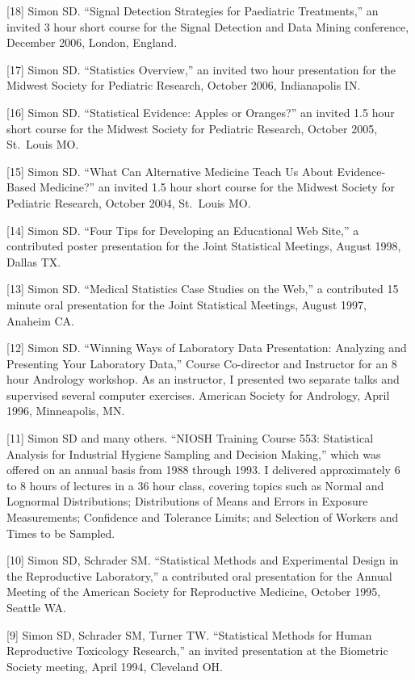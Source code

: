 \documentclass[
  12pt,
]{article}
\begin{document}
{[}18{]} Simon SD. ``Signal Detection Strategies for Paediatric
Treatments,'' an invited 3 hour short course for the Signal Detection
and Data Mining conference, December 2006, London, England.

{[}17{]} Simon SD. ``Statistics Overview,'' an invited two hour
presentation for the Midwest Society for Pediatric Research, October
2006, Indianapolis IN.

{[}16{]} Simon SD. ``Statistical Evidence: Apples or Oranges?'' an
invited 1.5 hour short course for the Midwest Society for Pediatric
Research, October 2005, St.~Louis MO.

{[}15{]} Simon SD. ``What Can Alternative Medicine Teach Us About
Evidence-Based Medicine?'' an invited 1.5 hour short course for the
Midwest Society for Pediatric Research, October 2004, St.~Louis MO.

{[}14{]} Simon SD. ``Four Tips for Developing an Educational Web Site,''
a contributed poster presentation for the Joint Statistical Meetings,
August 1998, Dallas TX.

{[}13{]} Simon SD. ``Medical Statistics Case Studies on the Web,'' a
contributed 15 minute oral presentation for the Joint Statistical
Meetings, August 1997, Anaheim CA.

{[}12{]} Simon SD. ``Winning Ways of Laboratory Data Presentation:
Analyzing and Presenting Your Laboratory Data,'' Course Co-director and
Instructor for an 8 hour Andrology workshop. As an instructor, I
presented two separate talks and supervised several computer exercises.
American Society for Andrology, April 1996, Minneapolis, MN.

{[}11{]} Simon SD and many others. ``NIOSH Training Course 553:
Statistical Analysis for Industrial Hygiene Sampling and Decision
Making,'' which was offered on an annual basis from 1988 through 1993. I
delivered approximately 6 to 8 hours of lectures in a 36 hour class,
covering topics such as Normal and Lognormal Distributions;
Distributions of Means and Errors in Exposure Measurements; Confidence
and Tolerance Limits; and Selection of Workers and Times to be Sampled.

{[}10{]} Simon SD, Schrader SM. ``Statistical Methods and Experimental
Design in the Reproductive Laboratory,'' a contributed oral presentation
for the Annual Meeting of the American Society for Reproductive
Medicine, October 1995, Seattle WA.

{[}9{]} Simon SD, Schrader SM, Turner TW. ``Statistical Methods for
Human Reproductive Toxicology Research,'' an invited presentation at the
Biometric Society meeting, April 1994, Cleveland OH.
\end{document}
